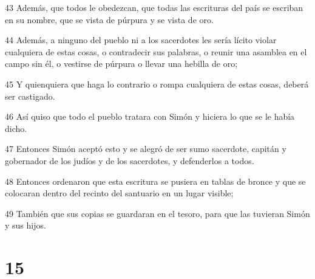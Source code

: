\par 43 Además, que todos le obedezcan, que todas las escrituras del país se escriban en su nombre, que se vista de púrpura y se vista de oro.
\par 44 Además, a ninguno del pueblo ni a los sacerdotes les sería lícito violar cualquiera de estas cosas, o contradecir sus palabras, o reunir una asamblea en el campo sin él, o vestirse de púrpura o llevar una hebilla de oro;
\par 45 Y quienquiera que haga lo contrario o rompa cualquiera de estas cosas, deberá ser castigado.
\par 46 Así quiso que todo el pueblo tratara con Simón y hiciera lo que se le había dicho.
\par 47 Entonces Simón aceptó esto y se alegró de ser sumo sacerdote, capitán y gobernador de los judíos y de los sacerdotes, y defenderlos a todos.
\par 48 Entonces ordenaron que esta escritura se pusiera en tablas de bronce y que se colocaran dentro del recinto del santuario en un lugar visible;
\par 49 También que sus copias se guardaran en el tesoro, para que las tuvieran Simón y sus hijos.

\chapter{15}

